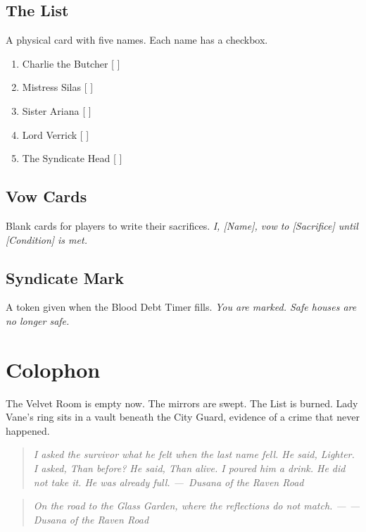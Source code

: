 \documentclass[12pt]{book}
\newcommand{\dusana}[1]{%
    \begin{quote}\itshape #1 ---~Dusana of the Raven Road\end{quote}}
\newcommand{\letter}[2]{%
    \begin{quote}\small\itshape #1 \hfill --- #2\end{quote}}
\begin{document}
\section{The List}

A physical card with five names. Each name has a checkbox.
\begin{enumerate}
    \item Charlie the Butcher [ ]
    \item Mistress Silas [ ]
    \item Sister Ariana [ ]
    \item Lord Verrick [ ]
    \item The Syndicate Head [ ]
\end{enumerate}

\section{Vow Cards}

Blank cards for players to write their sacrifices.
\textit{I, [Name], vow to [Sacrifice] until [Condition] is met.}

\section{Syndicate Mark}

A token given when the Blood Debt Timer fills.
\textit{You are marked. Safe houses are no longer safe.}

\chapter{Colophon}

The Velvet Room is empty now. The mirrors are swept. The List is burned. Lady Vane's ring sits in a vault beneath the City Guard, evidence of a crime that never happened.

\vspace{1em}
\dusana{I asked the survivor what he felt when the last name fell. He said, \textit{Lighter.} I asked, \textit{Than before?} He said, \textit{Than alive.} I poured him a drink. He did not take it. He was already full.}

\vspace{1em}
\letter{On the road to the Glass Garden, where the reflections do not match.}{--- Dusana of the Raven Road}
\end{document}
